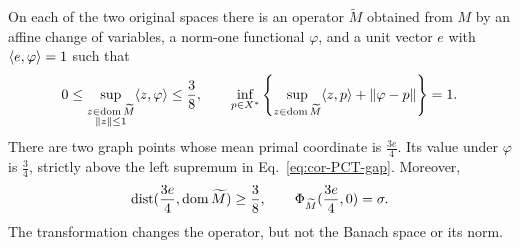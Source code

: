 \begin{corollary}\label{cor:two-row}
On each of the two original spaces there is an operator $\widetilde M$
obtained from $M$ by an affine change of variables, a norm-one functional $\varphi$, and a
unit vector $e$ with $\langle e,\varphi\rangle=1$ such that
\begin{equation}
0\le \sup_{\substack{z\in\operatorname{dom}\widetilde M\\\|z\|\le1}}
\langle z,\varphi\rangle\le\frac38,
\qquad
\inf_{p\in X^*}\left\{
\sup_{z\in\operatorname{dom}\widetilde M}\langle z,p\rangle+\|\varphi-p\|
\right\}=1.
\label{eq:cor-PCT-gap}
\end{equation}
There are two graph points whose mean primal coordinate is $\frac{3e}{4}$.
Its value under $\varphi$ is $\frac{3}{4}$, strictly above the left supremum in
Eq.~\eqref{eq:cor-PCT-gap}. Moreover,
\begin{equation}
\operatorname{dist}(\frac{3e}{4},\operatorname{dom}\widetilde M)\ge\frac38,
\qquad \Phi_{\widetilde M}(\frac{3e}{4},0)=\sigma.
\label{eq:cor-finite-projection-hole}
\end{equation}
The transformation changes the operator, but not the Banach space or
its norm.
\end{corollary}
